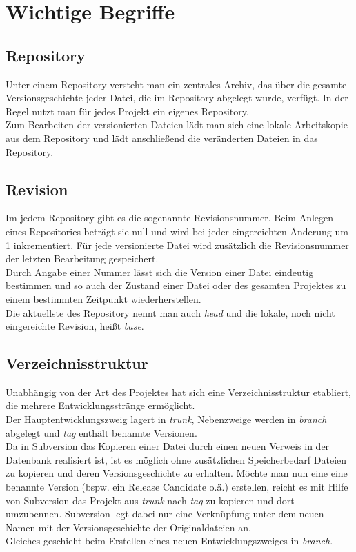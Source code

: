 \section{Wichtige Begriffe}
\subsection{Repository}
Unter einem Repository versteht man ein zentrales Archiv, das über die gesamte Versionsgeschichte jeder Datei, die im Repository abgelegt wurde, verfügt. In der Regel nutzt man für jedes Projekt ein eigenes Repository.\\
Zum Bearbeiten der versionierten Dateien lädt man sich eine lokale Arbeitskopie aus dem Repository und lädt anschließend die veränderten Dateien in das Repository.
\subsection{Revision}
Im jedem Repository gibt es die sogenannte Revisionsnummer. Beim Anlegen eines Repositories beträgt sie null und wird bei jeder eingereichten Änderung um 1 inkrementiert. Für jede versionierte Datei wird zusätzlich die Revisionsnummer der letzten Bearbeitung gespeichert.\\
Durch Angabe einer Nummer lässt sich die Version einer Datei eindeutig bestimmen und so auch der Zustand einer Datei oder des gesamten Projektes zu einem bestimmten Zeitpunkt wiederherstellen.\\
Die aktuellste des Repository nennt man auch \emph{head} und die lokale, noch nicht eingereichte Revision, heißt \emph{base}.
\subsection{Verzeichnisstruktur}
Unabhängig von der Art des Projektes hat sich eine Verzeichnisstruktur etabliert, die mehrere Entwicklungsstränge ermöglicht.\\
Der Hauptentwicklungszweig lagert in \emph{trunk}, Nebenzweige werden in \emph{branch} abgelegt und \emph{tag} enthält benannte Versionen.\\
Da in Subversion das Kopieren einer Datei durch einen neuen Verweis in der Datenbank  realisiert ist, ist es möglich ohne zusätzlichen Speicherbedarf Dateien zu kopieren und deren Versionsgeschichte zu erhalten. Möchte man nun eine eine benannte Version (bspw. ein Release Candidate o.ä.) erstellen, reicht es mit Hilfe von Subversion das Projekt aus \emph{trunk} nach \emph{tag} zu kopieren und dort umzubennen. Subversion legt dabei nur eine Verknüpfung unter dem neuen Namen mit der Versionsgeschichte der Originaldateien an.\\
Gleiches geschieht beim Erstellen eines neuen Entwicklungszweiges in \emph{branch}.
